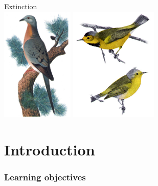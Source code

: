 \documentclass[color=usenames,dvipsnames]{beamer}\usepackage[]{graphicx}\usepackage[]{color}
\begin{document}
\begin{frame}[plain]
  \begin{center}
    {\Huge Extinction} \\
    \vfill
    \includegraphics[height=5.5cm,keepaspectratio]{figs/passenger-pigeon} \hspace{0.5cm}
    \includegraphics[height=5.5cm,keepaspectratio]{figs/Vermivora_bachmanii} %
  \end{center}
\end{frame}




\section{Introduction}


\begin{frame}[plain]
  \frametitle{Learning objectives}
  \tableofcontents%
\end{frame}
\end{document}
